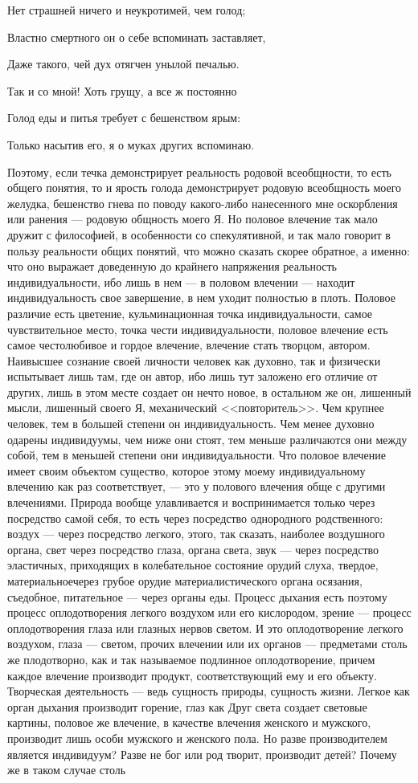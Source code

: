 \documentclass[12pt]{article}
\begin{document}
Нет страшней ничего и неукротимей, чем голод; 

Властно смертного он о себе вспоминать заставляет, 

Даже такого, чей дух отягчен унылой печалью. 

Так и со мной! Хоть грущу, а все ж постоянно 

Голод еды и питья требует с бешенством ярым: 

Только насытив его, я о муках других вспоминаю. 

Поэтому, если течка демонстрирует реальность родовой всеобщности, то есть общего понятия, то и ярость голода демонстрирует родовую всеобщность моего желудка, бешенство гнева по поводу какого-либо нанесенного мне оскорбления или ранения --- родовую общность моего Я. Но половое влечение так мало дружит с философией, в особенности со спекулятивной, и так мало говорит в пользу реальности общих понятий, что можно сказать скорее обратное, а именно: что оно выражает доведенную до крайнего напряжения реальность индивидуальности, ибо лишь в нем --- в половом влечении --- находит индивидуальность свое завершение, в нем уходит полностью в плоть. Половое различие есть цветение, кульминационная точка индивидуальности, самое чувствительное место, точка чести индивидуальности, половое влечение есть самое честолюбивое и гордое влечение, влечение стать творцом, автором. Наивысшее сознание своей личности человек как духовно, так и физически испытывает лишь там, где он автор, ибо лишь тут заложено его отличие от других, лишь в этом месте создает он нечто новое, в остальном же он, лишенный мысли, лишенный своего Я, механический <<повторитель>>. Чем крупнее человек, тем в большей степени он индивидуальность. Чем менее духовно одарены индивидуумы, чем ниже они стоят, тем меньше различаются они между собой, тем в меньшей степени они индивидуальности. Что половое влечение имеет своим объектом существо, которое этому моему индивидуальному влечению как раз соответствует, --- это у полового влечения обще с другими влечениями. Природа вообще улавливается и воспринимается только через посредство самой себя, то есть через посредство однородного родственного: воздух --- через посредство легкого, этого, так сказать, наиболее воздушного органа, свет через посредство глаза, органа света, звук --- через посредство эластичных, приходящих в колебательное состояние орудий слуха, твердое, материальноечерез грубое орудие материалистического органа осязания, съедобное, питательное --- через органы еды. Процесс дыхания есть поэтому процесс оплодотворения легкого воздухом или его кислородом, зрение --- процесс оплодотворения глаза или глазных нервов светом. И это оплодотворение легкого воздухом, глаза --- светом, прочих влечении или их органов --- предметами столь же плодотворно, как и так называемое подлинное оплодотворение, причем каждое влечение производит продукт, соответствующий ему и его объекту. Творческая деятельность --- ведь сущность природы, сущность жизни. Легкое как орган дыхания производит горение, глаз как Друг света создает световые картины, половое же влечение, в качестве влечения женского и мужского, производит лишь особи мужского и женского пола. Но разве производителем является индивидуум? Разве не бог или род творит, производит детей? Почему же в таком случае столь 
\end{document}
